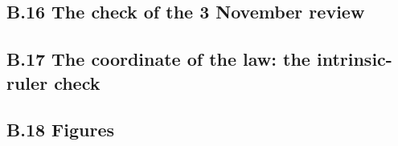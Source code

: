 \documentclass[11pt]{article}
\begin{document}
\subsection*{B.16 The check of the 3 November review}



\subsection*{B.17 The coordinate of the law: the intrinsic-ruler check}





\subsection*{B.18 Figures}






\end{document}
